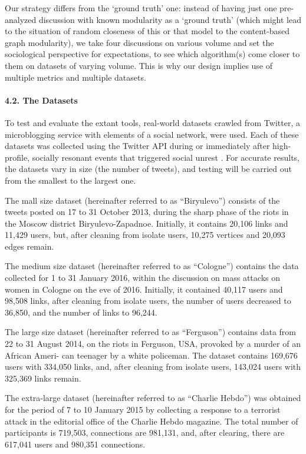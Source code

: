 Our strategy differs from the ‘ground truth’ one: instead of having just one pre- analyzed discussion with known modularity as a ‘ground truth’ (which might lead to the situation of random closeness of this or that model to the content-based graph modularity), we take four discussions on various volume and set the sociological perspective for expectations, to see which algorithm(s) come closer to them on datasets of varying volume. This is why our design implies use of multiple metrics and multiple datasets.

\paragraph{4.2. The Datasets} To test and evaluate the extant tools, real-world datasets crawled from Twitter, a microblogging service with elements of a social network, were used. Each of these datasets was collected using the Twitter API during or immediately after high-profile, socially resonant events that triggered social unrest \cite{BodrunovaBlekanovSmoliarova,BodrunovaLitvinenkoBlekanov,BodrunovaBlekanov}. For accurate results, the datasets vary in size (the number of tweets), and testing will be carried out from the smallest to the largest one.

The mall size dataset (hereinafter referred to as “Biryulevo”) consists of the tweets posted on 17 to 31 October 2013, during the sharp phase of the riots in the Moscow district Biryulevo-Zapadnoe. Initially, it contains 20,106 links and 11,429 users, but, after cleaning from isolate users, 10,275 vertices and 20,093 edges remain.

The medium size dataset (hereinafter referred to as “Cologne”) contains the data collected for 1 to 31 January 2016, within the discussion on mass attacks on women in Cologne on the eve of 2016. Initially, it contained 40,117 users and 98,508 links, after cleaning from isolate users, the number of users decreased to 36,850, and the number of links to 96,244.

The large size dataset (hereinafter referred to as “Ferguson”) contains data from 22 to 31 August 2014, on the riots in Ferguson, USA, provoked by a murder of an African Ameri- can teenager by a white policeman. The dataset contains 169,676 users with 334,050 links, and, after cleaning from isolate users, 143,024 users with 325,369 links remain.

The extra-large dataset (hereinafter referred to as “Charlie Hebdo”) was obtained for the period of 7 to 10 January 2015 by collecting a response to a terrorist attack in the editorial office of the Charlie Hebdo magazine. The total number of participants is 719,503, connections are 981,131, and, after clearing, there are 617,041 users and 980,351 connections.

